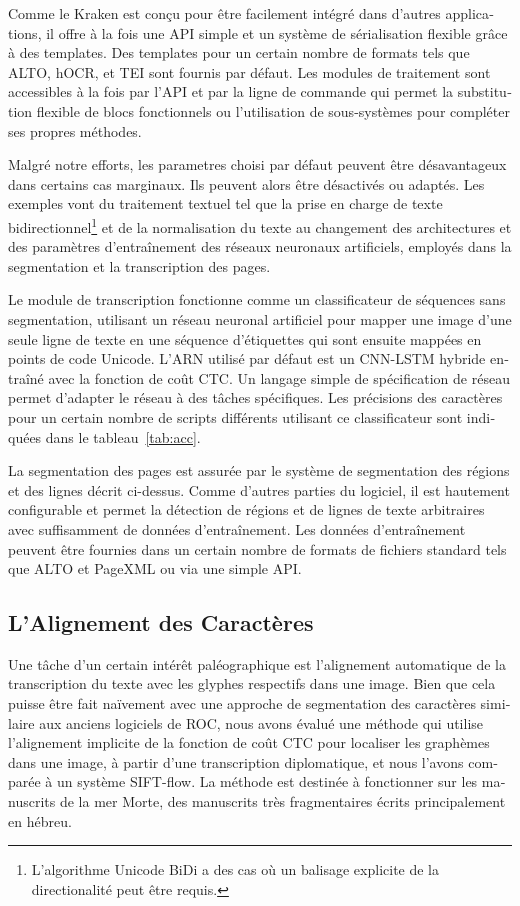 \begin{french}
Comme le Kraken est conçu pour être facilement intégré dans d'autres
applications, il offre à la fois une API simple et un système de sérialisation
flexible grâce à des templates. Des templates pour un certain nombre de formats
tels que ALTO, hOCR, et TEI sont fournis par défaut. Les modules de traitement
sont accessibles à la fois par l'API et par la ligne de commande qui permet la
substitution flexible de blocs fonctionnels ou l'utilisation de sous-systèmes
pour compléter ses propres méthodes.

Malgré notre efforts, les parametres choisi par défaut peuvent être désavantageux dans certains cas marginaux.
Ils peuvent alors être désactivés ou adaptés. Les exemples vont du traitement textuel tel que la prise en charge
de texte bidirectionnel\footnote{L'algorithme Unicode BiDi a des cas où un
balisage explicite de la directionalité peut être requis.} et de la
normalisation du texte au changement des architectures et des paramètres
d'entraînement des réseaux neuronaux artificiels, employés dans la segmentation
et la transcription des pages.

Le module de transcription fonctionne comme un classificateur de séquences sans
segmentation, utilisant un réseau neuronal artificiel pour mapper une image
d'une seule ligne de texte en une séquence d'étiquettes qui sont ensuite
mappées en points de code Unicode.  L'ARN utilisé par défaut est un CNN-LSTM
hybride entraîné avec la fonction de coût CTC. Un langage simple de
spécification de réseau permet d'adapter le réseau à des tâches spécifiques.
Les précisions des caractères pour un certain nombre de scripts différents
utilisant ce classificateur sont indiquées dans le tableau~\ref{tab:acc}.

La segmentation des pages est assurée par le système de segmentation des
régions et des lignes décrit ci-dessus. Comme d'autres parties du logiciel, il
est hautement configurable et permet la détection de régions et de lignes de
texte arbitraires avec suffisamment de données d'entraînement. Les données
d'entraînement peuvent être fournies dans un certain nombre de formats de
fichiers standard tels que ALTO et PageXML ou via une simple API.

\subsection{L'Alignement des Caractères}

Une tâche d'un certain intérêt paléographique est l'alignement automatique de
la transcription du texte avec les glyphes respectifs dans une image. Bien que
cela puisse être fait naïvement avec une approche de segmentation des
caractères similaire aux anciens logiciels de ROC, nous avons évalué une
méthode qui utilise l'alignement implicite de la fonction de coût CTC pour
localiser les graphèmes dans une image, à partir d'une transcription
diplomatique, et nous l'avons comparée à un système SIFT-flow. La méthode est
destinée à fonctionner sur les manuscrits de la mer Morte, des manuscrits très
fragmentaires écrits principalement en hébreu.


\end{french}
